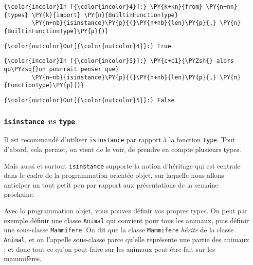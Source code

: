     \begin{Verbatim}[commandchars=\\\{\},frame=single,framerule=0.3mm,rulecolor=\color{cellframecolor}]
{\color{incolor}In [{\color{incolor}4}]:} \PY{k+kn}{from} \PY{n+nn}{types} \PY{k}{import} \PY{n}{BuiltinFunctionType}
        \PY{n+nb}{isinstance}\PY{p}{(}\PY{n+nb}{len}\PY{p}{,} \PY{n}{BuiltinFunctionType}\PY{p}{)}
\end{Verbatim}


\begin{Verbatim}[commandchars=\\\{\},frame=single,framerule=0.3mm,rulecolor=\color{cellframecolor}]
{\color{outcolor}Out[{\color{outcolor}4}]:} True
\end{Verbatim}
            
    \begin{Verbatim}[commandchars=\\\{\},frame=single,framerule=0.3mm,rulecolor=\color{cellframecolor}]
{\color{incolor}In [{\color{incolor}5}]:} \PY{c+c1}{\PYZsh{} alors qu\PYZsq{}on pourrait penser que}
        \PY{n+nb}{isinstance}\PY{p}{(}\PY{n+nb}{len}\PY{p}{,} \PY{n}{FunctionType}\PY{p}{)}
\end{Verbatim}


\begin{Verbatim}[commandchars=\\\{\},frame=single,framerule=0.3mm,rulecolor=\color{cellframecolor}]
{\color{outcolor}Out[{\color{outcolor}5}]:} False
\end{Verbatim}
            
    \hypertarget{isinstance-vs-type}{%
\subsubsection{\texorpdfstring{\texttt{isinstance} \emph{vs}
\texttt{type}}{isinstance vs type}}\label{isinstance-vs-type}}

    Il est recommandé d'utiliser \texttt{isinstance} par rapport à la
fonction \texttt{type}. Tout d'abord, cela permet, on vient de le voir,
de prendre en compte plusieurs types.

Mais aussi et surtout \texttt{isinstance} supporte la notion d'héritage
qui est centrale dans le cadre de la programmation orientée objet, sur
laquelle nous allons anticiper un tout petit peu par rapport aux
présentations de la semaine prochaine.

Avec la programmation objet, vous pouvez définir vos propres types. On
peut par exemple définir une classe \texttt{Animal} qui convient pour
tous les animaux, puis définir une sous-classe \texttt{Mammifere}. On
dit que la classe \texttt{Mammifere} \emph{hérite} de la classe
\texttt{Animal}, et on l'appelle sous-classe parce qu'elle représente
une partie des animaux ; et donc tout ce qu'on peut faire sur les
animaux peut être fait sur les mammifères.

